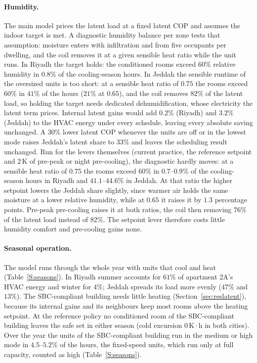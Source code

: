 \documentclass[10pt,a4paper,twocolumn]{article}
\theoremstyle{definition}
\begin{document}
\paragraph{Humidity.} The main model prices the latent load at a fixed latent COP and assumes the indoor target is met. A diagnostic humidity balance per zone tests that assumption: moisture enters with infiltration and from five occupants per dwelling, and the coil removes it at a given sensible heat ratio while the unit runs. In Riyadh the target holds: the conditioned rooms exceed $60\%$ relative humidity in $0.8\%$ of the cooling-season hours. In Jeddah the sensible runtime of the oversized units is too short: at a sensible heat ratio of $0.75$ the rooms exceed $60\%$ in $41\%$ of the hours ($21\%$ at $0.65$), and the coil removes $82\%$ of the latent load, so holding the target needs dedicated dehumidification, whose electricity the latent term prices. Internal latent gains would add $0.2\%$ (Riyadh) and $3.2\%$ (Jeddah) to the HVAC energy under every schedule, leaving every absolute saving unchanged. A $30\%$ lower latent COP whenever the units are off or in the lowest mode raises Jeddah's latent share to $33\%$ and leaves the scheduling result unchanged. Run for the levers themselves (current practice, the reference setpoint and $2\,$K of pre-peak or night pre-cooling), the diagnostic hardly moves: at a sensible heat ratio of $0.75$ the rooms exceed $60\%$ in $0.7$--$0.9$\% of the cooling-season hours in Riyadh and $41.1$--$44.6$\% in Jeddah. At that ratio the higher setpoint lowers the Jeddah share slightly, since warmer air holds the same moisture at a lower relative humidity, while at $0.65$ it raises it by $1.3$ percentage points. Pre-peak pre-cooling raises it at both ratios, the coil then removing $76\%$ of the latent load instead of $82\%$. The setpoint lever therefore costs little humidity comfort and pre-cooling gains none.

\paragraph{Seasonal operation.} The model runs through the whole year with units that cool and heat (Table~\ref{S:seasons}). In Riyadh summer accounts for $61\%$ of apartment 2A's HVAC energy and winter for $4\%$; Jeddah spreads its load more evenly ($47\%$ and $13\%$). The SBC-compliant building needs little heating (Section~\ref{sec:reslatent}), because its internal gains and its neighbours keep most rooms above the heating setpoint. At the reference policy no conditioned room of the SBC-compliant building leaves the safe set in either season (cold excursion $0\,\mathrm{K}\cdot\mathrm{h}$ in both cities). Over the year the units of the SBC-compliant building run in the medium or high mode in $4.5$--$5.2$\% of the hours, the fixed-speed units, which run only at full capacity, counted as high (Table~\ref{S:seasons}).
\end{document}
